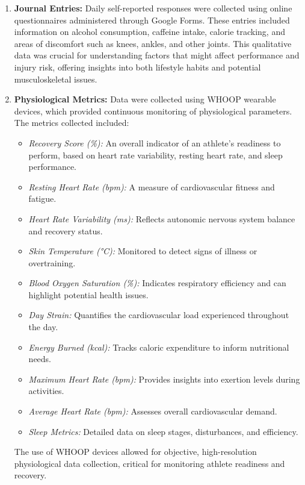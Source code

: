 \documentclass[manuscript,acmsmall,review,screen,authorversion=true]{acmart}
\begin{document}
\begin{enumerate}
    \item \textbf{Journal Entries:} Daily self-reported responses were collected using online questionnaires administered through Google Forms. These entries included information on alcohol consumption, caffeine intake, calorie tracking, and areas of discomfort such as knees, ankles, and other joints. This qualitative data was crucial for understanding factors that might affect performance and injury risk, offering insights into both lifestyle habits and potential musculoskeletal issues.

    \item \textbf{Physiological Metrics:} Data were collected using WHOOP wearable devices, which provided continuous monitoring of physiological parameters. The metrics collected included:
    \begin{itemize}
        \item \textit{Recovery Score (\%):} An overall indicator of an athlete's readiness to perform, based on heart rate variability, resting heart rate, and sleep performance.
        \item \textit{Resting Heart Rate (bpm):} A measure of cardiovascular fitness and fatigue.
        \item \textit{Heart Rate Variability (ms):} Reflects autonomic nervous system balance and recovery status.
        \item \textit{Skin Temperature (°C):} Monitored to detect signs of illness or overtraining.
        \item \textit{Blood Oxygen Saturation (\%):} Indicates respiratory efficiency and can highlight potential health issues.
        \item \textit{Day Strain:} Quantifies the cardiovascular load experienced throughout the day.
        \item \textit{Energy Burned (kcal):} Tracks caloric expenditure to inform nutritional needs.
        \item \textit{Maximum Heart Rate (bpm):} Provides insights into exertion levels during activities.
        \item \textit{Average Heart Rate (bpm):} Assesses overall cardiovascular demand.
        \item \textit{Sleep Metrics:} Detailed data on sleep stages, disturbances, and efficiency.
    \end{itemize}
    The use of WHOOP devices allowed for objective, high-resolution physiological data collection, critical for monitoring athlete readiness and recovery.


\end{enumerate}
\end{document}
